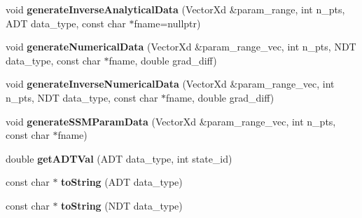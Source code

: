 \begin{DoxyCompactItemize}
\item 
\hypertarget{classDiagnostics_a8a57ff04d757f8a636c39612f662fa84}{void {\bfseries generate\-Inverse\-Analytical\-Data} (Vector\-Xd \&param\-\_\-range, int n\-\_\-pts, A\-D\-T data\-\_\-type, const char $\ast$fname=nullptr)}\label{classDiagnostics_a8a57ff04d757f8a636c39612f662fa84}

\item 
\hypertarget{classDiagnostics_ad0ad6ffb5f002e0e8a1ecc338448d110}{void {\bfseries generate\-Numerical\-Data} (Vector\-Xd \&param\-\_\-range\-\_\-vec, int n\-\_\-pts, N\-D\-T data\-\_\-type, const char $\ast$fname, double grad\-\_\-diff)}\label{classDiagnostics_ad0ad6ffb5f002e0e8a1ecc338448d110}

\item 
\hypertarget{classDiagnostics_a9abeba172d4abb8eb7c0af244db62f2b}{void {\bfseries generate\-Inverse\-Numerical\-Data} (Vector\-Xd \&param\-\_\-range\-\_\-vec, int n\-\_\-pts, N\-D\-T data\-\_\-type, const char $\ast$fname, double grad\-\_\-diff)}\label{classDiagnostics_a9abeba172d4abb8eb7c0af244db62f2b}

\item 
\hypertarget{classDiagnostics_a2bb91e6c3834e78bd9c942dafd4bbd2d}{void {\bfseries generate\-S\-S\-M\-Param\-Data} (Vector\-Xd \&param\-\_\-range\-\_\-vec, int n\-\_\-pts, const char $\ast$fname)}\label{classDiagnostics_a2bb91e6c3834e78bd9c942dafd4bbd2d}

\item 
\hypertarget{classDiagnostics_add36dde58c8394f3f8114917dff0a6d2}{double {\bfseries get\-A\-D\-T\-Val} (A\-D\-T data\-\_\-type, int state\-\_\-id)}\label{classDiagnostics_add36dde58c8394f3f8114917dff0a6d2}

\item 
\hypertarget{classDiagnostics_afb08d86a96a43318682d79b51b366d69}{const char $\ast$ {\bfseries to\-String} (A\-D\-T data\-\_\-type)}\label{classDiagnostics_afb08d86a96a43318682d79b51b366d69}

\item 
\hypertarget{classDiagnostics_a5e41fad93ecbd3fe6f91fa2f3d2e7c40}{const char $\ast$ {\bfseries to\-String} (N\-D\-T data\-\_\-type)}\label{classDiagnostics_a5e41fad93ecbd3fe6f91fa2f3d2e7c40}

\end{DoxyCompactItemize}
